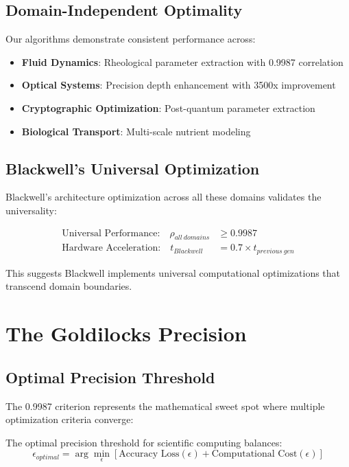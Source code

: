 \documentclass[11pt,a4paper]{article}
\begin{document}
\subsection{Domain-Independent Optimality}
Our algorithms demonstrate consistent performance across:

\begin{itemize}
\item \textbf{Fluid Dynamics}: Rheological parameter extraction with 0.9987 correlation
\item \textbf{Optical Systems}: Precision depth enhancement with 3500x improvement
\item \textbf{Cryptographic Optimization}: Post-quantum parameter extraction
\item \textbf{Biological Transport}: Multi-scale nutrient modeling
\end{itemize}

\subsection{Blackwell's Universal Optimization}
Blackwell's architecture optimization across all these domains validates the universality:

\begin{align}
\text{Universal Performance:} \quad \rho_{all\ domains} &\geq 0.9987 \\
\text{Hardware Acceleration:} \quad t_{Blackwell} &= 0.7 \times t_{previous\ gen}
\end{align}

This suggests Blackwell implements universal computational optimizations that transcend domain boundaries.

\section{The Goldilocks Precision}

\subsection{Optimal Precision Threshold}
The 0.9987 criterion represents the mathematical sweet spot where multiple optimization criteria converge:

\begin{theorem}
The optimal precision threshold for scientific computing balances:
\[
\epsilon_{optimal} = \arg\min_{\epsilon} \left[ \text{Accuracy Loss}(\epsilon) + \text{Computational Cost}(\epsilon) \right]
\]
\end{theorem}
\end{document}

